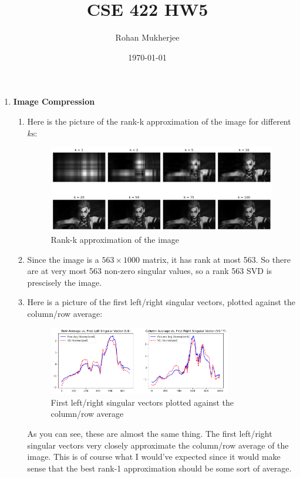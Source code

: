 \documentclass[12pt]{article}
\title{CSE 422 HW5}
\date{\today}
\author{Rohan Mukherjee}
\theoremstyle{definitionstyle}
\begin{document}
    \maketitle
    \begin{enumerate}[leftmargin=\labelsep]
        \item \textbf{Image Compression}
        \begin{enumerate}[label=\textbf{(\alph*)}]
            \item Here is the picture of the rank-k approximation of the image for different $k$s:
            \begin{figure}[H]
                \centering
                \includegraphics[width=\textwidth]{rank_k_approx.png}
                \caption{Rank-k approximation of the image}
            \end{figure}
    
            \item Since the image is a $563\times 1000$ matrix, it has rank at most 563. So there are at very most 563 non-zero singular values, so a rank 563 SVD is prescisely the image.
    
            \item Here is a picture of the first left/right singular vectors, plotted against the column/row average:
            \begin{figure}[H]
                \centering
                \includegraphics[width=0.8\textwidth]{left_and_right_sing.png}
                \caption{First left/right singular vectors plotted against the column/row average}
            \end{figure}
            As you can see, these are almost the same thing. The first left/right singular vectors very closely approximate the column/row average of the image. This is of course what I would've expected since it would make sense that the best rank-1 approximation should be some sort of average.
    

\end{enumerate}
\end{enumerate}
\end{document}
